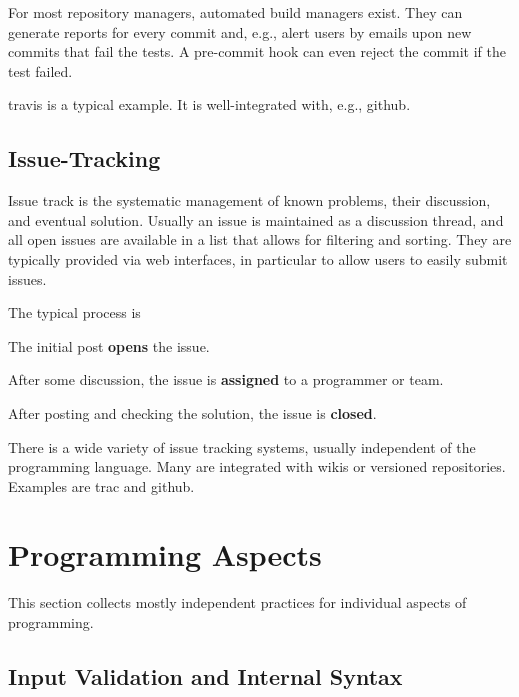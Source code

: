 For most repository managers, automated build managers exist.
They can generate reports for every commit and, e.g., alert users by emails upon new commits that fail the tests.
A pre-commit hook can even reject the commit if the test failed.

travis is a typical example.
It is well-integrated with, e.g., github.

\subsection{Issue-Tracking}

Issue track is the systematic management of known problems, their discussion, and eventual solution.
Usually an issue is maintained as a discussion thread, and all open issues are available in a list that allows for filtering and sorting.
They are typically provided via web interfaces, in particular to allow users to easily submit issues.

The typical process is
\begin{compactenum}
 \item The initial post \textbf{opens} the issue.
 \item After some discussion, the issue is \textbf{assigned} to a programmer or team.
 \item After posting and checking the solution, the issue is \textbf{closed}.
\end{compactenum}

There is a wide variety of issue tracking systems, usually independent of the programming language.
Many are integrated with wikis or versioned repositories.
Examples are trac and github.

\section{Programming Aspects}

This section collects mostly independent practices for individual aspects of programming.

\subsection{Input Validation and Internal Syntax}

